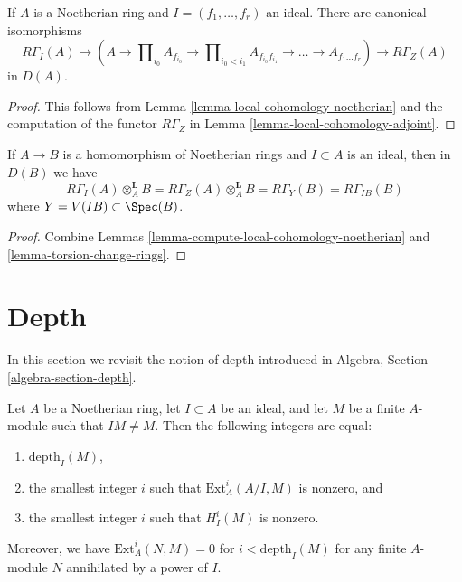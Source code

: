 \begin{lemma}
\label{lemma-compute-local-cohomology-noetherian}
If $A$ is a Noetherian ring and $I = (f_1, \ldots, f_r)$ an ideal.
There are canonical isomorphisms
$$
R\Gamma_I(A) \to
(A \to \prod\nolimits_{i_0} A_{f_{i_0}} \to
\prod\nolimits_{i_0 < i_1} A_{f_{i_0}f_{i_1}} \to
\ldots \to A_{f_1\ldots f_r}) \to R\Gamma_Z(A)
$$
in $D(A)$.
\end{lemma}

\begin{proof}
This follows from Lemma \ref{lemma-local-cohomology-noetherian}
and the computation of the functor $R\Gamma_Z$ in
Lemma \ref{lemma-local-cohomology-adjoint}.
\end{proof}

\begin{lemma}
\label{lemma-local-cohomology-change-rings}
If $A \to B$ is a homomorphism of Noetherian rings and $I \subset A$
is an ideal, then in $D(B)$ we have
$$
R\Gamma_I(A) \otimes_A^\mathbf{L} B =
R\Gamma_Z(A) \otimes_A^\mathbf{L} B =
R\Gamma_Y(B) = R\Gamma_{IB}(B)
$$
where $Y = V(IB) \subset \Spec(B)$.
\end{lemma}

\begin{proof}
Combine Lemmas \ref{lemma-compute-local-cohomology-noetherian} and
\ref{lemma-torsion-change-rings}.
\end{proof}






\section{Depth}
\label{section-depth}

\noindent
In this section we revisit the notion of depth introduced in
Algebra, Section \ref{algebra-section-depth}.

\begin{lemma}
\label{lemma-depth}
Let $A$ be a Noetherian ring, let $I \subset A$ be an ideal, and
let $M$ be a finite $A$-module such that $IM \not = M$. Then
the following integers are equal:
\begin{enumerate}
\item $\text{depth}_I(M)$,
\item the smallest integer $i$ such that $\text{Ext}_A^i(A/I, M)$
is nonzero, and
\item the smallest integer $i$ such that $H^i_I(M)$ is nonzero.
\end{enumerate}
Moreover, we have $\text{Ext}^i_A(N, M) = 0$ for $i < \text{depth}_I(M)$
for any finite $A$-module $N$ annihilated by a power of $I$.
\end{lemma}

